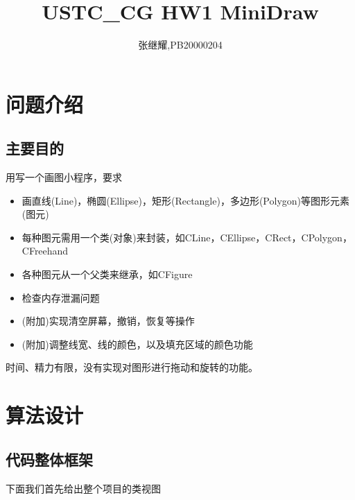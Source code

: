 \documentclass{article}
\title{USTC\_CG HW1 MiniDraw}
\author{张继耀,PB20000204}
\begin{document}
	\maketitle
	
		\tableofcontents
	
	\section {问题介绍}
		 \subsection{主要目的}
	
	用写一个画图小程序，要求
	\begin{itemize}
		\item 画直线(Line)，椭圆(Ellipse)，矩形(Rectangle)，多边形(Polygon)等图形元素(图元)
	\end{itemize}
    \begin{itemize}
	\item 每种图元需用一个类(对象)来封装，如CLine，CEllipse，CRect，CPolygon，CFreehand
    \end{itemize}
   \begin{itemize}
	\item 各种图元从一个父类来继承，如CFigure
   \end{itemize}
   \begin{itemize}
	\item 检查内存泄漏问题
\end{itemize}
    \begin{itemize}
   	\item (附加)实现清空屏幕，撤销，恢复等操作
   \end{itemize}
 \begin{itemize}
	\item (附加)调整线宽、线的颜色，以及填充区域的颜色功能
\end{itemize}
  
   时间、精力有限，没有实现对图形进行拖动和旋转的功能。
  
	\section{算法设计}
	 \subsection{代码整体框架}
	 
	 下面我们首先给出整个项目的类视图
	
\end{document}
